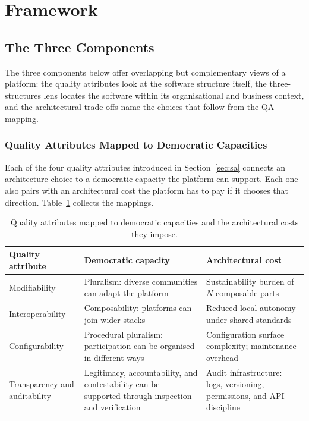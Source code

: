 \documentclass[11pt,a4paper]{article}
\begin{document}
\section{Framework}\label{sec:framework}

\subsection{The Three Components}\label{sec:framework-three}

The three components below offer overlapping but complementary views of a platform: the quality attributes look at the software structure itself, the three-structures lens locates the software within its organisational and business context, and the architectural trade-offs name the choices that follow from the QA mapping.

\subsubsection{Quality Attributes Mapped to Democratic Capacities}\label{sec:framework-qas}

Each of the four quality attributes introduced in Section~\ref{sec:sa} connects an architecture choice to a democratic capacity the platform can support. Each one also pairs with an architectural cost the platform has to pay if it chooses that direction. Table~\ref{tab:qa-mapping} collects the mappings.

\begin{table}[!htbp]
\centering
\caption{Quality attributes mapped to democratic capacities and the architectural costs they impose.}
\label{tab:qa-mapping}
\renewcommand{\arraystretch}{1.15}
\begin{tabularx}{\textwidth}{lXX}
\toprule
\textbf{Quality attribute} & \textbf{Democratic capacity} & \textbf{Architectural cost} \\
\midrule
Modifiability & Pluralism: diverse communities can adapt the platform & Sustainability burden of $N$ composable parts \\
\midrule
Interoperability & Composability: platforms can join wider stacks & Reduced local autonomy under shared standards \\
\midrule
Configurability & Procedural pluralism: participation can be organised in different ways & Configuration surface complexity; maintenance overhead \\
\midrule
Transparency and auditability & Legitimacy, accountability, and contestability can be supported through inspection and verification & Audit infrastructure: logs, versioning, permissions, and API discipline \\
\bottomrule
\end{tabularx}
\end{table}
\end{document}
